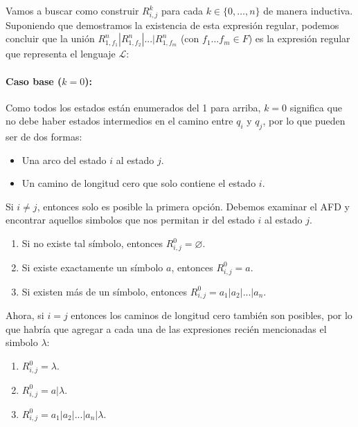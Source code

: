 Vamos a buscar como construir \(R^k_{i,j}\) para cada \(k\in\{0, \dots, n\}\) de manera inductiva. Suponiendo que demostramos la existencia de esta expresión regular, podemos concluir que la unión \(R^n_{1,f_1}|R^n_{1,f_2}|...|R^n_{1,f_m}\) (con \(f_1\dots f_m\in F\)) es la expresión regular que representa el lenguaje \(\mathcal{L}\):

\paragraph*{Caso base (\(k=0\)):} Como todos los estados están enumerados del 1 para arriba, \(k=0\) significa que no debe haber estados intermedios en el camino entre \(q_i\) y \(q_j\), por lo que pueden ser de dos formas:
\begin{itemize}
  \item Una arco del estado \(i\) al estado \(j\).
  \item Un camino de longitud cero que solo contiene el estado \(i\).
\end{itemize}

Si \(i\neq j\), entonces solo es posible la primera opción. Debemos examinar el AFD y encontrar aquellos simbolos que nos permitan ir del estado \(i\) al estado \(j\).

\begin{enumerate}
  \item Si no existe tal símbolo, entonces \(R^0_{i,j} = \varnothing\).
  \item Si existe exactamente un símbolo \(a\), entonces \(R^0_{i,j} = a\).
  \item Si existen más de un símbolo, entonces \(R^0_{i,j} = a_1|a_2|...|a_n\).
\end{enumerate}

Ahora, si \(i = j\) entonces los caminos de longitud cero también son posibles, por lo que habría que agregar a cada una de las expresiones recién mencionadas el simbolo \(\lambda\):
\begin{enumerate}
  \item \(R^0_{i,j} = \lambda\).
  \item \(R^0_{i,j} = a|\lambda\).
  \item \(R^0_{i,j} = a_1|a_2|...|a_n|\lambda\).
\end{enumerate}

